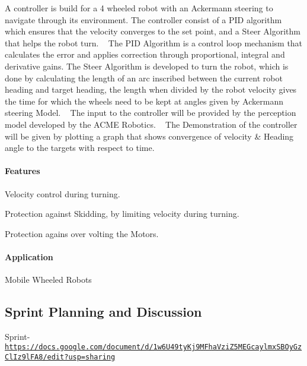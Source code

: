 A controller is build for a 4 wheeled robot with an Ackermann steering to navigate through its environment. The controller consist of a P\+ID algorithm which ensures that the velocity converges to the set point, and a Steer Algorithm that helps the robot turn. ~\newline
The P\+ID Algorithm is a control loop mechanism that calculates the error and applies correction through proportional, integral and derivative gains. The Steer Algorithm is developed to turn the robot, which is done by calculating the length of an arc inscribed between the current robot heading and target heading, the length when divided by the robot velocity gives the time for which the wheels need to be kept at angles given by Ackermann steering Model. ~\newline
The input to the controller will be provided by the perception model developed by the A\+C\+ME Robotics. ~\newline
The Demonstration of the controller will be given by plotting a graph that shows convergence of velocity \& Heading angle to the targets with respect to time.

\paragraph*{Features}


\begin{DoxyItemize}
\item Velocity control during turning.
\item Protection against Skidding, by limiting velocity during turning.
\item Protection agains over volting the Motors.
\end{DoxyItemize}

\paragraph*{Application}


\begin{DoxyItemize}
\item Mobile Wheeled Robots
\end{DoxyItemize}

\subsection*{Sprint Planning and Discussion}

Sprint-\/ \href{https://docs.google.com/document/d/1w6U49tyKj9MFhaVziZ5MEGcaylmxSBOyGzClIz9lFA8/edit?usp=sharing}{\tt https\+://docs.\+google.\+com/document/d/1w6\+U49ty\+Kj9\+M\+Fha\+Vzi\+Z5\+M\+E\+Gcaylmx\+S\+B\+Oy\+Gz\+Cl\+Iz9l\+F\+A8/edit?usp=sharing}

